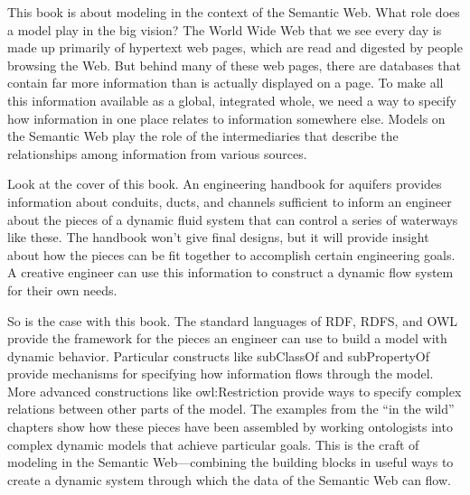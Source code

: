 This book is about modeling in the context of the Semantic Web. What
role does a model play in the big vision? The World Wide Web that we see
every day is made up primarily of hypertext web pages, which are read and digested
by people browsing the Web. But behind many of these web pages, there
are databases that contain far more information than is actually
displayed on a page. To make all this information available as a global,
integrated whole, we need a way to specify how information in one place
relates to information somewhere else. Models on the Semantic Web play
the role of the intermediaries that describe the relationships among
information from various sources.

Look at the cover of this book. An engineering handbook for aquifers
provides information about conduits, ducts, and channels sufficient to
inform an engineer about the pieces of a dynamic fluid system that can
control a series of waterways like these. The handbook won't give final
designs, but it will provide insight about how the pieces can be fit
together to accomplish certain engineering goals. A creative engineer
can use this information to construct a dynamic flow system for their own
needs.

So is the case with this book. The standard languages of RDF, RDFS, and
OWL provide the framework for the pieces an engineer can use to build a
model with dynamic behavior. Particular constructs like subClassOf and
subPropertyOf provide mechanisms for specifying how information flows
through the model. More advanced constructions like owl:Restriction
provide ways to specify complex relations between other parts of the
model. The examples from the ``in the wild'' chapters show how these
pieces have been assembled by working ontologists into complex dynamic
models that achieve particular goals. This is the craft of modeling in
the Semantic Web---combining the building blocks in useful ways to
create a dynamic system through which the data of the Semantic Web can
flow.
